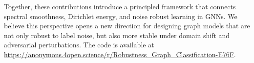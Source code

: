 Together, these contributions introduce a principled framework that connects spectral smoothness, Dirichlet energy, and noise robust learning in GNNs. We believe this perspective opens a new direction for designing graph models that are not only robust to label noise, but also more stable under domain shift and adversarial perturbations. The code is available at \url{https://anonymous.4open.science/r/Robustness_Graph_Classification-E76F}.


